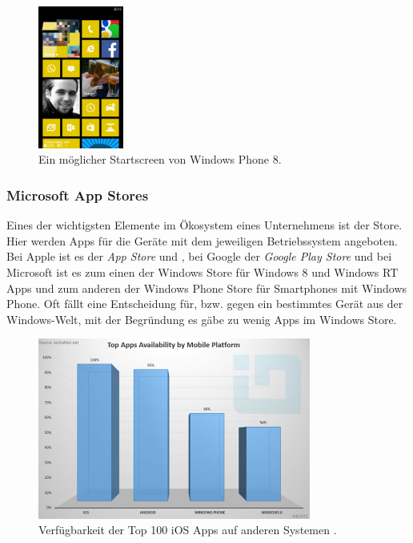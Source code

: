 \documentclass[12pt,a4paper,bibtotoc,abstracton]{scrartcl}
\begin{document}
\begin{figure}[h]	
	\centering
	\includegraphics[width=0.25\textwidth]{Bilder/Screenshots/wp8/wp8_start.png} 
	\caption{Ein möglicher Startscreen von Windows Phone 8.}
	\label{fig:wp8}
\end{figure}  

\subsubsection{Microsoft App Stores}
\label{subsubsec:stores}
Eines der wichtigsten Elemente im Ökosystem eines Unternehmens ist der Store. Hier werden Apps für die Geräte mit dem jeweiligen Betriebssystem angeboten. Bei Apple ist es der \textit{App Store} und , bei Google der \textit{Google Play Store} und bei Microsoft ist es  zum einen der Windows Store für Windows 8 und Windows RT Apps und zum anderen der Windows Phone Store für Smartphones mit Windows Phone. Oft fällt eine Entscheidung für, bzw. gegen ein bestimmtes Gerät aus der Windows-Welt, mit der Begründung es gäbe zu wenig Apps im Windows Store.

\begin{figure}[h]	
	\centering
	\includegraphics[width=0.8\textwidth]{Bilder/Abbildungen/store_chart.jpg} 
	\caption{Verfügbarkeit der Top 100 iOS Apps auf anderen Systemen \citep{WinbetaStore2013}.}
	\label{fig:storechart}
\end{figure}  
\end{document}
